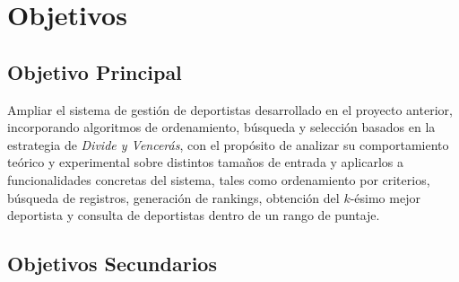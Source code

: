 \chapter{Objetivos}

\section{Objetivo Principal}

Ampliar el sistema de gestión de deportistas desarrollado en el proyecto anterior, incorporando algoritmos de ordenamiento, búsqueda y selección basados en la estrategia de \textit{Divide y Vencerás}, con el propósito de analizar su comportamiento teórico y experimental sobre distintos tamaños de entrada y aplicarlos a funcionalidades concretas del sistema, tales como ordenamiento por criterios, búsqueda de registros, generación de rankings, obtención del $k$-ésimo mejor deportista y consulta de deportistas dentro de un rango de puntaje. \\

\section{Objetivos Secundarios}

